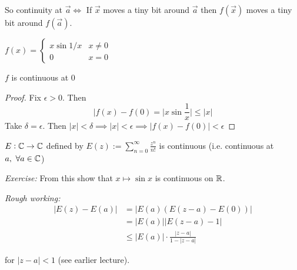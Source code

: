 \documentclass[10pt,twoside]{scrartcl}
\begin{document}
So continuity at $\vec{a} \iff$ If $\vec{x}$ moves a tiny bit around $\vec{a}$ then $f(\vec{x})$ moves a tiny bit around $f(\vec{a})$.\\

\begin{example}
$f(x) = \begin{cases}
 	x\sin 1/x & x \neq 0\\
 	0 & x = 0
 \end{cases}$

\begin{center}
\end{center}


\begin{proposition}
$f$ is continuous at $0$	
\end{proposition}

\begin{proof}
Fix $\epsilon >0$. Then 
\[|f(x) - f(0) = |x\sin\frac{1}{x}| \leq |x|\]
Take $\delta = \epsilon$. Then $|x| < \delta \implies |x| < \epsilon \implies |f(x) - f(0)| < \epsilon$	
\end{proof}
\end{example}\vspace*{5pt}

\begin{proposition}
$E: \mathbb{C} \to \mathbb{C}$ defined by $E(z) := \sum_{n=0}^{\infty} \frac{z^n}{n!}$ is continuous (i.e. continuous at $a,~\forall a \in\mathbb{C}$)	
\end{proposition}
\emph{Exercise:} From this show that $x \mapsto \sin x$ is continuous on $\mathbb{R}$.

\emph{Rough working:} 
\begin{align*}
|E(z) - E(a)| &= |E(a)(E(z-a)-E(0))| \\ 	
&= |E(a)| |E(z-a) -1|\\
& \leq |E(a)| \cdot \frac{|z-a|}{1-|z-a|}
\end{align*}

for $|z-a| < 1$ (see earlier lecture).
\end{document}
